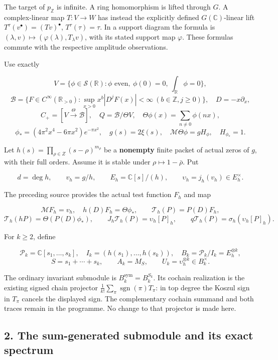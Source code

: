 \documentclass[
]{article}
\begin{document}
The target of \(p_{\mathbb Z}\) is infinite. A ring homomorphism is
lifted through \(G\). A complex-linear map \(T:V\to W\) has instead the
explicitly defined \(G(\mathbb C)\)-linear lift
\(T^\tau(v^\bullet)=(Tv)^\bullet\), \(T^\tau(\tau)=\tau\). In a support
diagram the formula is
\((\lambda,v)\mapsto(\varphi(\lambda),T_\lambda v)\), with its stated
support map \(\varphi\). These formulas commute with the respective
amplitude observations.

Use exactly

\[V=\{\phi\in\mathcal S(\mathbb R):\phi\text{ even},\ \phi(0)=0,\ \int_{\mathbb R}\phi=0\},\]
\[\mathscr B=\{F\in C^\infty(\mathbb R_{>0}):\sup_{x>0}x^b|D^jF(x)|<\infty\ (b\in\mathbb Z,j\ge0)\},\quad D=-x\partial_x,\]
\[C_+=[V\xrightarrow{\Theta}\mathscr B],\quad Q=\mathscr B/\Theta V,\quad
\Theta\phi(x)=\sum_{n\ne0}\phi(nx),\]
\[\phi_*=(4\pi^2x^4-6\pi x^2)e^{-\pi x^2},\quad
 g(s)=2\xi(s),\quad \mathcal M\Theta\phi=gH_\phi,\quad H_{\phi_*}=1.\tag{1.2}\]

Let \(h(s)=\prod_{\rho\in Z}(s-\rho)^{m_\rho}\) be a \textbf{nonempty}
finite packet of actual zeros of \(g\), with their full orders. Assume
it is stable under \(\rho\mapsto1-\bar\rho\). Put

\[d=\deg h,\qquad v_h=g/h,\qquad E_h=\mathbb C[s]/(h),\qquad
\upsilon_h=j_h(v_h)\in E_h^\times.\tag{1.3}\]

The preceding source provides the actual test function \(F_h\) and map

\[\mathcal MF_h=v_h,\quad h(D)F_h=\Theta\phi_*,\qquad
\mathcal T_h(P)=P(D)F_h,\] \[\mathcal T_h(hP)=\Theta(P(D)\phi_*),\qquad
J_h\mathcal T_h(P)=\upsilon_h[P]_h,\qquad
q\mathcal T_h(P)=\sigma_h(\upsilon_h[P]_h).\tag{1.4}\]

For \(k\ge2\), define

\[\mathcal P_k=\mathbb C[s_1,\ldots,s_k],\quad I_k=(h(s_1),\ldots,h(s_k)),\quad
B_k=\mathcal P_k/I_k=E_h^{\otimes k},\]
\[S=s_1+\cdots+s_k,\qquad A_k=M_S,\qquad U_k=\upsilon_h^{\otimes k}\in B_k^\times.\tag{1.5}\]

The ordinary invariant submodule is \(B_k^{\mathrm{sym}}=B_k^{S_k}\).
Its cochain realization is the existing signed chain projector
\(\frac1{k!}\sum_\pi\operatorname{sgn}(\pi)T_\pi\): in top degree the
Koszul sign in \(T_\pi\) cancels the displayed sign. The complementary
cochain summand and both traces remain in the programme. No change to
that projector is made here.

\subsection{2. The sum-generated submodule and its exact
spectrum}\label{the-sum-generated-submodule-and-its-exact-spectrum}
\end{document}
